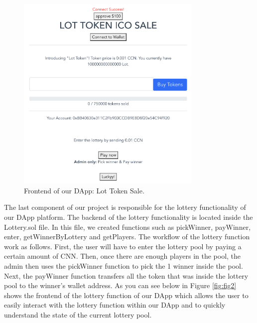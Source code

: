 \documentclass[11pt]{article}
\newcommand {\rfig}[1]{Figure \ref{fig:#1}}
\begin{document}
\begin{figure}[!t]
\centering
\includegraphics[width=3.5in]{figure1.png}
\caption{Frontend of our DApp: Lot Token Sale.}
\label{fig:fig1}
\end{figure}

The last component of our project is responsible for the lottery functionality of our DApp platform. The backend of the lottery functionality is located inside the Lottery.sol file. In this file, we created functions such as pickWinner, payWinner, enter, getWinnerByLottery and getPlayers. The workflow of the lottery function work as follows. First, the user will have to enter the lottery pool by paying a certain amount of CNN. Then, once there are enough players in the pool, the admin then uses the pickWinner function to pick the 1 winner inside the pool. Next, the payWinner function transfers all the token that was inside the lottery pool to the winner’s wallet address. As you can see below in \rfig{fig2} shows the frontend of the lottery function of our DApp which allows the user to easily interact with the lottery function within our DApp and to quickly understand the state of the current lottery pool.\\
\end{document}
